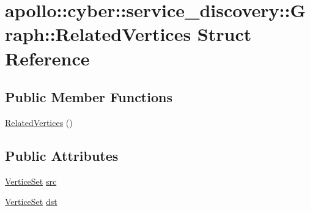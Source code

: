 \hypertarget{structapollo_1_1cyber_1_1service__discovery_1_1Graph_1_1RelatedVertices}{\section{apollo\-:\-:cyber\-:\-:service\-\_\-discovery\-:\-:Graph\-:\-:Related\-Vertices Struct Reference}
\label{structapollo_1_1cyber_1_1service__discovery_1_1Graph_1_1RelatedVertices}
}
\subsection*{Public Member Functions}
\begin{DoxyCompactItemize}
\item 
\hyperlink{structapollo_1_1cyber_1_1service__discovery_1_1Graph_1_1RelatedVertices_a50f57f9c0adba14007aa84fb09e23a97}{Related\-Vertices} ()
\end{DoxyCompactItemize}
\subsection*{Public Attributes}
\begin{DoxyCompactItemize}
\item 
\hyperlink{classapollo_1_1cyber_1_1service__discovery_1_1Graph_ad9bc989f8c0b0495694872a2bb65f008}{Vertice\-Set} \hyperlink{structapollo_1_1cyber_1_1service__discovery_1_1Graph_1_1RelatedVertices_a494b12998fc985c55a5c384fc58de21d}{src}
\item 
\hyperlink{classapollo_1_1cyber_1_1service__discovery_1_1Graph_ad9bc989f8c0b0495694872a2bb65f008}{Vertice\-Set} \hyperlink{structapollo_1_1cyber_1_1service__discovery_1_1Graph_1_1RelatedVertices_a1c4fcacd9c6e4fa1c6ed7949bbae684a}{dst}
\end{DoxyCompactItemize}


